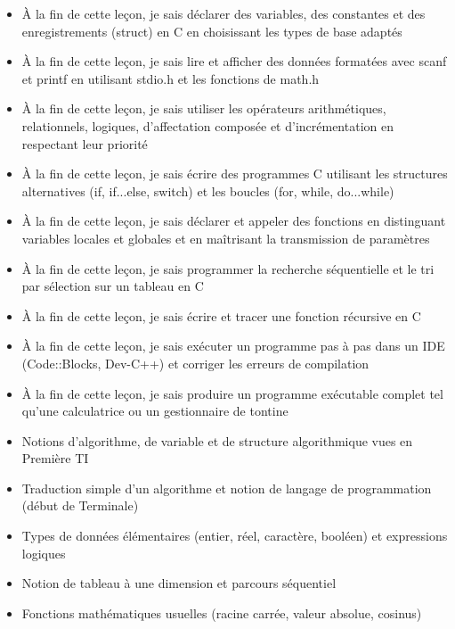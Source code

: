 \documentclass[11pt]{article}
\begin{document}
\begin{objectifs}
\begin{itemize}
\item À la fin de cette leçon, je sais déclarer des variables, des constantes et des enregistrements (struct) en C en choisissant les types de base adaptés
\item À la fin de cette leçon, je sais lire et afficher des données formatées avec scanf et printf en utilisant stdio.h et les fonctions de math.h
\item À la fin de cette leçon, je sais utiliser les opérateurs arithmétiques, relationnels, logiques, d'affectation composée et d'incrémentation en respectant leur priorité
\item À la fin de cette leçon, je sais écrire des programmes C utilisant les structures alternatives (if, if...else, switch) et les boucles (for, while, do...while)
\item À la fin de cette leçon, je sais déclarer et appeler des fonctions en distinguant variables locales et globales et en maîtrisant la transmission de paramètres
\item À la fin de cette leçon, je sais programmer la recherche séquentielle et le tri par sélection sur un tableau en C
\item À la fin de cette leçon, je sais écrire et tracer une fonction récursive en C
\item À la fin de cette leçon, je sais exécuter un programme pas à pas dans un IDE (Code::Blocks, Dev-C++) et corriger les erreurs de compilation
\item À la fin de cette leçon, je sais produire un programme exécutable complet tel qu'une calculatrice ou un gestionnaire de tontine
\end{itemize}
\end{objectifs}

\begin{prerequis}
\begin{itemize}
\item Notions d'algorithme, de variable et de structure algorithmique vues en Première TI
\item Traduction simple d'un algorithme et notion de langage de programmation (début de Terminale)
\item Types de données élémentaires (entier, réel, caractère, booléen) et expressions logiques
\item Notion de tableau à une dimension et parcours séquentiel
\item Fonctions mathématiques usuelles (racine carrée, valeur absolue, cosinus)
\end{itemize}
\end{prerequis}
\end{document}
